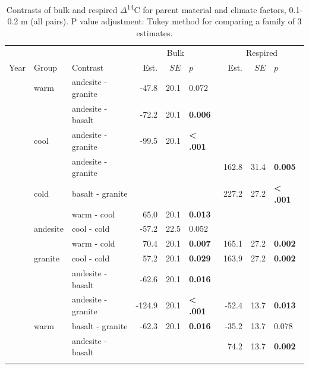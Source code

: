 \documentclass[english,man,floatsintext]{apa6}
\begin{document}
\begin{longtable}[t]{rllrrlrrl}
\caption{\label{tab:blk-inc-contrasts-20}Contrasts of bulk and respired \(\Delta\)\textsuperscript{14}C for parent material and climate factors, 0.1-0.2 m (all pairs). P value adjustment: Tukey method for comparing a family of 3 estimates.}\\
\toprule
\multicolumn{3}{c}{ } & \multicolumn{3}{c}{Bulk} & \multicolumn{3}{c}{Respired} \\
\cmidrule(l{3pt}r{3pt}){4-6} \cmidrule(l{3pt}r{3pt}){7-9}
Year & Group & Contrast & Est. & $SE$ & $p$ & Est. & $SE$ & $p$\\
\midrule
 & warm & andesite - granite & -47.8 & 20.1 & 0.072 &  &  & \\
\nopagebreak
 &  & andesite - basalt & -72.2 & 20.1 & \textbf{0.006} &  &  & \\
\nopagebreak
 & \multirow[t]{-2}{*}{\raggedright\arraybackslash cool} & andesite - granite & -99.5 & 20.1 & \textbf{< .001} &  &  & \\
\nopagebreak
 &  & andesite - granite &  &  &  & 162.8 & 31.4 & \textbf{0.005}\\
\nopagebreak
 & \multirow[t]{-2}{*}{\raggedright\arraybackslash cold} & basalt - granite &  &  &  & 227.2 & 27.2 & \textbf{< .001}\\
\nopagebreak
 &  & warm - cool & 65.0 & 20.1 & \textbf{0.013} &  &  & \\
\nopagebreak
 & \multirow[t]{-2}{*}{\raggedright\arraybackslash andesite} & cool - cold & -57.2 & 22.5 & 0.052 &  &  & \\
\nopagebreak
 &  & warm - cold & 70.4 & 20.1 & \textbf{0.007} & 165.1 & 27.2 & \textbf{0.002}\\
\nopagebreak
\multirow[t]{-9}{*}{\raggedleft\arraybackslash 2001} & \multirow[t]{-2}{*}{\raggedright\arraybackslash granite} & cool - cold & 57.2 & 20.1 & \textbf{0.029} & 163.9 & 27.2 & \textbf{0.002}\\
\cmidrule{1-9}\pagebreak[0]
 &  & andesite - basalt & -62.6 & 20.1 & \textbf{0.016} &  &  & \\
\nopagebreak
 &  & andesite - granite & -124.9 & 20.1 & \textbf{< .001} & -52.4 & 13.7 & \textbf{0.013}\\
\nopagebreak
 & \multirow[t]{-3}{*}{\raggedright\arraybackslash warm} & basalt - granite & -62.3 & 20.1 & \textbf{0.016} & -35.2 & 13.7 & 0.078\\
\nopagebreak
 &  & andesite - basalt &  &  &  & 74.2 & 13.7 & \textbf{0.002}\\
\nopagebreak

\end{longtable}
\end{document}
